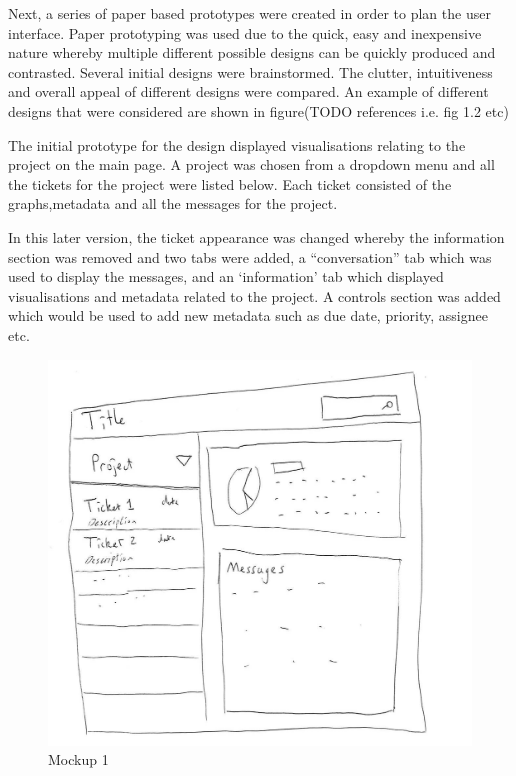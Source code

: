 \documentclass[a4paper]{l3proj}
\begin{document}
Next, a series of paper based prototypes were created in order to plan the user interface. Paper prototyping was used due to the quick, easy and inexpensive nature whereby multiple different possible designs can be quickly produced and contrasted. Several initial designs were brainstormed. The clutter, intuitiveness and overall appeal of different designs were compared.  An example of different designs that were considered are shown in figure(TODO references i.e. fig 1.2 etc)

The initial prototype for the design displayed visualisations relating to the project on the main page.  A project was chosen from a dropdown menu and all the tickets for the project were listed below.  Each ticket consisted of the graphs,metadata and all the messages for the project.

In this later version, the ticket appearance was changed whereby the information section was removed and two tabs were added, a ``conversation'' tab which was used to display the messages, and an ‘information’ tab which displayed visualisations and metadata related to the project.  A controls section was added which would be used to add new metadata such as due date, priority, assignee etc.

\begin{figure}
\includegraphics[scale=0.3]{mockup1}
\caption{Mockup 1}
\end{figure}
\end{document}
